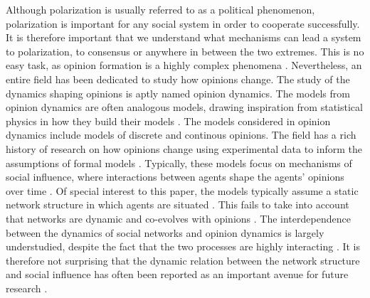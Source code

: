 \documentclass{article}
\begin{document}
Although polarization is usually referred to as a political phenomenon, polarization is important for any social system in order to cooperate successfully. It is therefore important that we understand what mechanisms can lead a system to polarization, to consensus or anywhere in between the two extremes. This is no easy task, as opinion formation is a highly complex phenomena \cite{baumann_modeling_2021}. 
Nevertheless, an entire field has been dedicated to study how opinions change. The study of the dynamics shaping opinions is aptly named opinion dynamics. The models from opinion dynamics are often analogous models, drawing inspiration from statistical physics in how they build their models \cite{galesic_integrating_2021}. The models considered in opinion dynamics include models of discrete and continous opinions. The field has a rich history of research on how opinions change using experimental data to inform the assumptions of formal models \cite{baumann_modeling_2021,chacoma_opinion_2015,flache_models_2017,friedkin_social_1990,noorazar_classical_2020,spears_social_2021,turner_paths_2018}. Typically, these models focus on mechanisms of social influence, where interactions between agents shape the agents’ opinions over time \cite{flache_models_2017}. Of special interest to this paper, the models typically assume a static network structure in which agents are situated \cite{galesic_integrating_2021}. This fails to take into account that networks are dynamic and co-evolves with opinions \cite{ferraz_de_arruda_modelling_2022,galesic_integrating_2021}. The interdependence between the dynamics of social networks and opinion dynamics is largely understudied, despite the fact that the two processes are highly interacting \cite{asikainen_cumulative_2020,bruch_agent-based_2015,galesic_integrating_2021,kossinets_origins_2009,noorazar_classical_2020}. It is therefore not surprising that the dynamic relation between the network structure and social influence has often been reported as an important avenue for future research \cite{flache_models_2017,galesic_integrating_2021}. 
\end{document}
